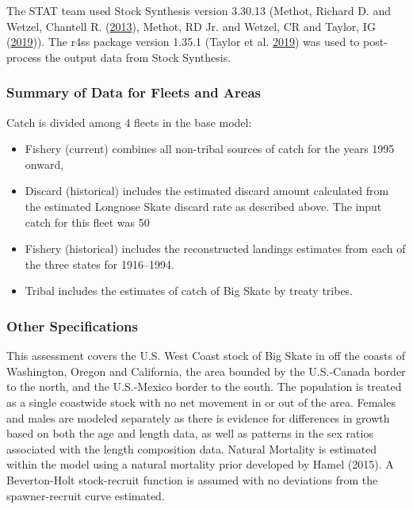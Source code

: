 \documentclass[12pt,]{article}
\begin{document}
The STAT team used Stock Synthesis version 3.30.13 (Methot, Richard D.
and Wetzel, Chantell R. (\protect\hyperlink{ref-Methot2013}{2013}),
Methot, RD Jr. and Wetzel, CR and Taylor, IG
(\protect\hyperlink{ref-Methot2019}{2019})). The r4ss package version
1.35.1 (Taylor et al. \protect\hyperlink{ref-Taylor2019}{2019}) was used
to post-process the output data from Stock Synthesis.

\hypertarget{summary-of-data-for-fleets-and-areas}{%
\subsubsection{Summary of Data for Fleets and
Areas}\label{summary-of-data-for-fleets-and-areas}}

Catch is divided among 4 fleets in the base model:

\begin{itemize}
\item Fishery (current) combines all non-tribal sources of catch for the years 1995 onward,
\item Discard (historical) includes the estimated discard amount calculated from the estimated Longnose Skate discard rate as described above. The input catch for this fleet was 50%
\item Fishery (historical) includes the reconstructed landings estimates from each of the three states for 1916--1994.
\item Tribal includes the estimates of catch of Big Skate by treaty tribes.
\end{itemize}

\hypertarget{other-specifications}{%
\subsubsection{Other Specifications}\label{other-specifications}}

This assessment covers the U.S. West Coast stock of Big Skate in off the
coasts of Washington, Oregon and California, the area bounded by the
U.S.-Canada border to the north, and the U.S.-Mexico border to the
south. The population is treated as a single coastwide stock with no net
movement in or out of the area. Females and males are modeled separately
as there is evidence for differences in growth based on both the age and
length data, as well as patterns in the sex ratios associated with the
length composition data. Natural Mortality is estimated within the model
using a natural mortality prior developed by Hamel (2015). A
Beverton-Holt stock-recruit function is assumed with no deviations from
the spawner-recruit curve estimated.
\end{document}
